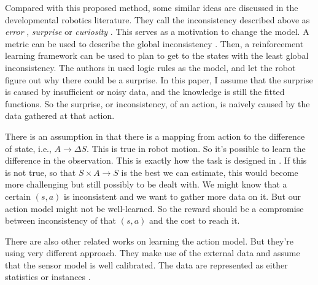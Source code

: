 \documentclass[10pt]{article}
\begin{document}
Compared with this proposed method, some similar ideas are discussed
in the developmental robotics literature. They call the inconsistency
described above as \textit{error} \cite{oudeyer2006discovering},
\textit{surprise} \cite{ranasinghe2008surprise} or \textit{curiosity}
\cite{schmidhuber2006developmental}. This serves as a motivation to
change the model. A metric can be used to describe the global
inconsistency \cite{oudeyer2006discovering}. Then, a reinforcement
learning framework can be used to plan to get to the states with the
least global inconsistency. The authors in
\cite{ranasinghe2008surprise} used logic rules as the model, and let
the robot figure out why there could be a surprise. In this paper, I
assume that the surprise is caused by insufficient or noisy data, and
the knowledge is still the fitted functions. So the surprise, or
inconsistency, of an action, is naively caused by the data gathered at
that action.

There is an assumption in \cite{CSJ06} that there is a mapping from
action to the difference of state, i.e., $A \rightarrow \Delta S$.
This is true in robot motion. So it's possible to learn the difference
in the observation. This is exactly how the task is designed in
\cite{ICDL10-hester}. If this is not true, so that $S \times A
\rightarrow S$ is the best we can estimate, this would become more
challenging but still possibly to be dealt with. We might know that a
certain $(s, a)$ is inconsistent and we want to gather more data on
it. But our action model might not be well-learned. So the reward
should be a compromise between inconsistency of that $(s, a)$ and the
cost to reach it.

There are also other related works on learning the action model. But
they're using very different approach. They make use of the external
data and assume that the sensor model is well calibrated. The data are
represented as either statistics \cite{And_learningand} or instances
\cite{LNAI2007-ahmadi}.




\end{document}

